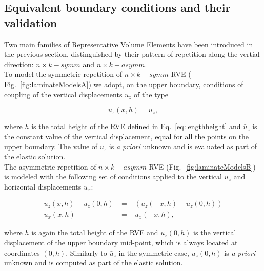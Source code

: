 \documentclass[smallextended]{svjour3}       %
\begin{document}
\subsection{Equivalent boundary conditions and their validation}\label{subsec:bc}

Two main families of Representative Volume Elements have been introduced in the previous section, distinguished by their pattern of repetition along the vertial direction: $n\times k-symm$ and $n\times k-asymm$.\\
To model the symmetric repetition of $n\times k-symm$ RVE ( Fig.~\ref{fig:laminateModelsA}) we adopt, on the upper boundary, conditions of coupling of the vertical displacements $u_{z}$ of the type

\begin{equation}\label{eq:symmcoupling}
u_{z}\left(x,h\right) = \bar{u}_{z},
\end{equation}

where $h$ is the total height of the RVE defined in Eq.~\ref{eq:lengthheight} and $\bar{u}_{z}$ is the constant value of the vertical displacement, equal for all the points on the upper boundary. The value of $\bar{u}_{z}$ is \emph{a priori} unknown and is evaluated as part of the elastic solution.\\
The asymmetric repetition of $n\times k-asymm$ RVE (Fig.~\ref{fig:laminateModelsB}) is modeled with the following set of conditions applied to the vertical $u_{z}$ and horizontal displacements $u_{x}$:

\begin{equation}\label{eq:asymmcoupling}
\begin{aligned}
u_{z}\left(x,h\right) - u_{z}\left(0,h\right) &= -\left(u_{z}\left(-x,h\right) - u_{z}\left(0,h\right)\right)\\
u_{x}\left(x,h\right) &= -u_{x}\left(-x,h\right),
\end{aligned}
\end{equation}

where $h$ is again the total height of the RVE and $u_{z}\left(0,h\right)$ is the vertical displacement of the upper boundary mid-point, which is always located at coordinates $(0,h)$. Similarly to $\bar{u}_{z}$ in the symmetric case, $u_{z}\left(0,h\right)$ is \emph{a priori} unknown and is computed as part of the elastic solution.
\end{document}
